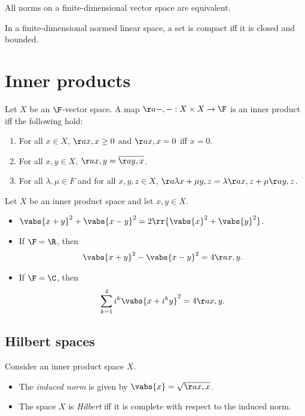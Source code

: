 \documentclass{article}
\begin{document}
\begin{theorem}
  All norms on a finite-dimensional vector space are equivalent.
\end{theorem}

\begin{theorem}
  In a finite-dimensional normed linear space, a set is compact iff it is
  closed and bounded.
\end{theorem}

\section{Inner products}

\begin{definition}
  Let $X$ be an $\F$-vector space. A map $\aa{-,-}:X\times X\to\F$ is an inner
  product iff the following hold:
  \begin{enumerate}
    \item For all $x\in X$, $\aa{x,x}\geq 0$ and $\aa{x,x}=0$ iff $x=0$.
    \item For all $x,y\in X$, $\aa{x,y}=\overline{\aa{y,x}}$.
    \item For all $\lambda,\mu\in F$ and for all $x,y,z\in X$, $\aa{\lambda x+\mu y,z}=\lambda\aa{x,z}+\mu\aa{y,z}$.
  \end{enumerate}
\end{definition}

\begin{theorem}
  Let $X$ be an inner product space and let $x,y\in X$.
  \begin{itemize}
    \item $\vabs{x+y}^2 + \vabs{x-y}^2 =
      2\rr{\vabs{x}^2+\vabs{y}^2}$.
    \item If $\F=\R$, then
      \begin{align*}
        \vabs{x+y}^2 - \vabs{x-y}^2 = 4\aa{x,y}.
      \end{align*}
    \item If $\F=\C$, then
      \begin{align*}
        \sum_{k=1}^4 i^k \vabs{x+i^k y}^2 = 4\aa{x,y}.
      \end{align*}
  \end{itemize}
\end{theorem}

\subsection{Hilbert spaces}

\begin{definition}
  Consider an inner product space $X$.
  \begin{itemize}
    \item The \emph{induced norm} is given by $\vabs{x} = \sqrt{\aa{x,x}}$.
    \item The space $X$ is \emph{Hilbert} iff it is complete with respect
      to the induced norm.
  \end{itemize}
\end{definition}
\end{document}
